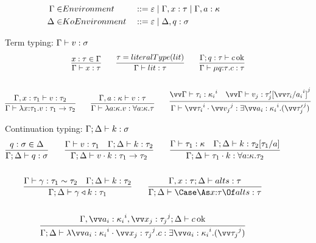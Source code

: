 \documentclass{article}
\begin{document}
\begin{figure}[h]
\centering
\begin{align*}
  \Gamma \in& Environment
  &
  &::= \varepsilon
  \mid \Gamma, x : \tau
  \mid \Gamma, a : \kappa
  \\
  \Delta \in& KoEnvironment
  &
  &::= \varepsilon
  \mid \Delta, q : \sigma
\end{align*}

Term typing: $\Gamma \vdash v : \sigma$
\begin{gather*}
  \infer
  {\Gamma \vdash x : \ty}
  {
    x:\ty \in \Gamma
  }
  \qquad
  \infer
  {\Gamma \vdash \lit : \ty}
  {\ty = literalType(\lit)}
  \qquad
  \infer
  {\Gamma \vdash \compute{\ann q \ty} \com : \ty}
  {
    \Gamma; q:\ty \vdash \com \Ok
  }
  \\\\
  \infer
  {\Gamma \vdash \fn{\ann x {\ty_1}} \tm : \ty_1 \to \ty_2}
  {
    \Gamma, x : \ty_1 \vdash \tm : \ty_2
  }
  \qquad
  \infer
  {\Gamma \vdash \fn{\ann a \ki} \tm : \forall \ann a \ki. \ty}
  {
    \Gamma, a:\ki \vdash \tm : \ty
  }
  \qquad
  \infer
  {
    \Gamma
    \vdash
    \packs{\vect[i]{\ty_i}}{\vect[j]{\tm_j}}
    :
    \stackty{\vect[i]{a_i:\ki_i}}{\vect[j]{\ty'_j}}
  }
  {
    \vect[i]{
      \Gamma \vdash \ty_i : \ki_i
    }
    &
    \vect[j]{
      \Gamma \vdash \tm_j : \ty'_j[\vect[i]{\ty_i/a_i}]
    }
  }
\end{gather*}

Continuation typing: $\Gamma; \Delta \vdash k : \sigma$
\begin{gather*}
  \infer
  {\Gamma;\Delta \vdash q : \sty}
  {
    q : \sty \in \Delta
  }
  \qquad
  \infer
  {\Gamma;\Delta \vdash \app{\tm}{\ko} : \ty_1 \to \ty_2}
  {
    \Gamma \vdash \tm : \ty_1
    &
    \Gamma;\Delta \vdash \ko : \ty_2
  }
  \qquad
  \infer
  {\Gamma;\Delta \vdash \app{\ty_1}{\ko} : \forall \ann a \ki. \ty_2}
  {
    \Gamma \vdash \ty_1 : \ki
    &
    \Gamma;\Delta \vdash \ko : \ty_2[\ty_1/a]
  }
  \\\\
  \infer
  {\Gamma;\Delta \vdash \koerce{\cn}{\ko} : \ty_1}
  {
    \Gamma \vdash \cn : \eqty{\ty_1}{\ty_2}
    &
    \Gamma;\Delta \vdash \ko : \ty_2
  }
  \qquad
  \infer
  {\Gamma;\Delta \vdash \caseas{\ann x \ty}{\alts} : \ty}
  {
    \Gamma, x:\ty;\Delta \vdash \alts : \ty
  }
  \\\\
  \infer
  {
    \Gamma;\Delta
    \vdash
    \fnk{\packs{\vect[i]{a_i:\ki_i}}{\vect[j]{x_j:\ty_j}}} \com
    :
    \stackty{\vect[i]{a_i:\ki_i}}{\vect[j]{\ty_j}}
  }
  {
    \Gamma,\vect[i]{a_i:\ki_i},\vect[j]{x_j:\ty_j};\Delta \vdash \com \Ok
  }
\end{gather*}


\end{figure}
\end{document}
